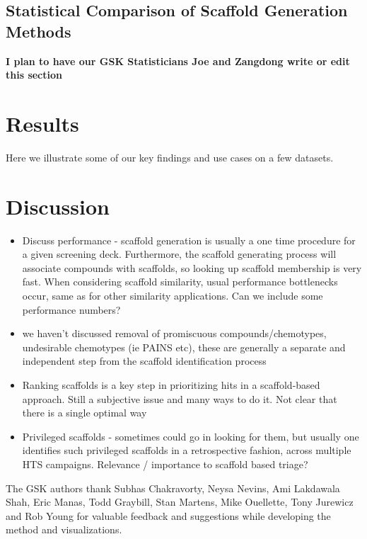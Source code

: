 \documentclass[journal=jacsat,manuscript=article]{achemso}
\begin{document}
\subsection{Statistical Comparison of Scaffold Generation Methods}
\textbf{I plan to have our GSK Statisticians Joe and Zangdong write or edit this section}

\section{Results}
\label{sec:results}
Here we illustrate some of our key findings and use cases on a few datasets. 

\section{Discussion}
\label{sec:discussion}

\begin{itemize}
\item Discuss performance - scaffold generation is usually a one time procedure
  for a given screening deck. Furthermore, the scaffold generating process will
  associate compounds with scaffolds, so looking up scaffold membership is very
  fast. When considering scaffold similarity, usual performance bottlenecks
  occur, same as for other similarity applications. Can we include some
  performance numbers?
\item we haven't discussed removal of promiscuous compounds/chemotypes,
  undesirable chemotypes (ie PAINS etc), these are generally a separate and
  independent step from the scaffold identification process
\item Ranking scaffolds is a key step in prioritizing hits in a scaffold-based
  approach. Still a subjective issue and many ways to do it. Not clear that
  there is a single optimal way
\item Privileged scaffolds - sometimes could go in looking for them, but usually
  one identifies such privileged scaffolds in a retrospective fashion, across
  multiple HTS campaigns. Relevance / importance to scaffold based triage?
\end{itemize}

\begin{acknowledgement}
  The GSK authors thank Subhas Chakravorty, Neysa Nevins, Ami Lakdawala Shah,
  Eric Manas, Todd Graybill, Stan Martens, Mike Ouellette, Tony Jurewicz and Rob
  Young for valuable feedback and suggestions while developing the method and
  visualizations.
\end{acknowledgement}
\end{document}
